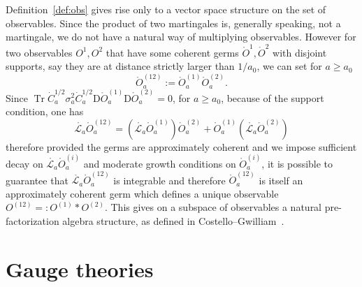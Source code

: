\documentclass[reprint,aps]{revtex4-2}
\newcommand{\assign}{:=}
\newcommand{\backassign}{=:}
\newcommand{\mathD}{\mathrm{D}}
\newcommand{\tmop}[1]{\ensuremath{\operatorname{#1}}}
\begin{document}
Definition~\ref{def:obs} gives rise only to a vector space structure on the
set of observables. Since the product of two martingales is, generally
speaking, not a martingale, we do not have a natural way of multiplying
observables. However for two observables $O^1, O^2$ that have some coherent
germs $\ring{O}^1, \ring{O}^2$ with disjoint supports, say they are at
distance strictly larger than $1 / a_0$, we can set for $a \geqslant a_0$
\[ \ring{O}^{(12)}_a \assign \ring{O}^{(1)}_a  \ring{O}^{(2)}_a . \]
Since $\tmop{Tr} \dot{C}_a^{1 / 2} \sigma_a^2 \dot{C}_a^{1 / 2} \mathD
\ring{O}^{(1)}_a \mathD \ring{O}^{(2)}_a = 0$, for $a \geqslant a_0$, because
of the support condition, one has
\[ \ring{\mathscr{L}_a}  \ring{O}^{(12)}_a = (\ring{\mathscr{L}_a} 
   \ring{O}^{(1)}_a) \ring{O}^{(2)}_a + \ring{O}^{(1)}_a (\ring{\mathscr{L}_a}
   \ring{O}^{(2)}_a) \]
therefore provided the germs are approximately coherent and we impose
sufficient decay on $\ring{\mathscr{L}_a}  \ring{O}^{(i)}_a$ and moderate
growth conditions on $\ring{O}^{(i)}_a$, it is possible to guarantee that
$\ring{\mathscr{L}_a}  \ring{O}^{(12)}_a$ is integrable and therefore
$\ring{O}^{(12)}_a$ is itself an approximately coherent germ which defines a
unique observable $O^{(12)} \backassign O^{(1)} \ast O^{(2)}$. This gives on a
subspace of observables a natural pre-factorization algebra structure, as
defined in
Costello--Gwilliam~{\cite{costelloFactorizationAlgebrasQuantum2017a,costelloFactorizationAlgebrasQuantum2021}}.

\section{Gauge theories}\label{SectionGauge}
\end{document}
